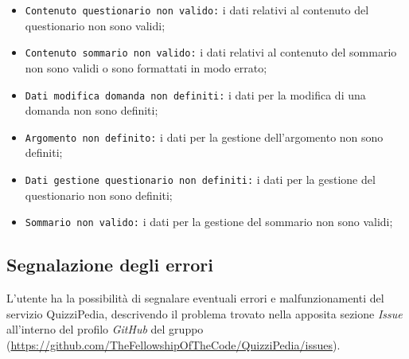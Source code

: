 \begin{itemize}
	\item \texttt{Contenuto questionario non valido:} i dati relativi al contenuto del questionario non sono validi;
	\item \texttt{Contenuto sommario non valido:} i dati relativi al contenuto del  sommario non sono validi o sono formattati in modo errato;
	\item \texttt{Dati modifica domanda non definiti:} i dati per la modifica di una domanda non sono definiti;
	\item \texttt{Argomento non definito:} i dati per la gestione dell'argomento non sono definiti;
	\item \texttt{Dati gestione questionario non definiti:} i dati per la gestione del questionario non sono definiti;
	\item \texttt{Sommario non valido:} i dati per la gestione del sommario non sono validi;
\end{itemize} 

\subsection{Segnalazione degli errori}
L'utente ha la possibilità di segnalare eventuali errori e malfunzionamenti del servizio QuizziPedia, descrivendo il problema trovato nella apposita sezione \textit{Issue} all'interno del profilo \textit{GitHub} del gruppo \gruppo{} (\url{https://github.com/TheFellowshipOfTheCode/QuizziPedia/issues}). 